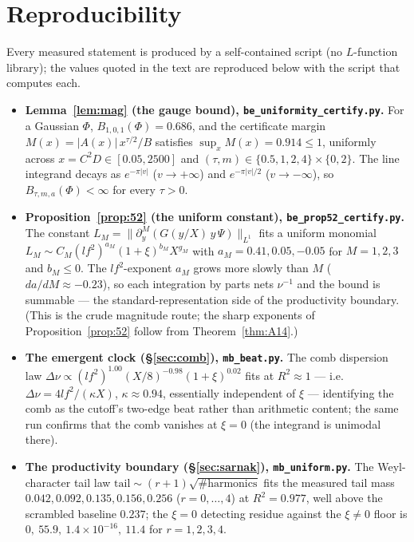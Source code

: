 \documentclass[11pt]{article}
\theoremstyle{definition}
\begin{document}
\appendix
\section{Reproducibility}\label{app:repro}

Every measured statement is produced by a self-contained script (no $L$-function library); the values
quoted in the text are reproduced below with the script that computes each.

\begin{itemize}
\item \textbf{Lemma~\ref{lem:mag} (the gauge bound), \texttt{be\_uniformity\_certify.py}.} For a
Gaussian $\Phi$, $B_{1,0,1}(\Phi)=0.686$, and the certificate margin
$M(x)=|A(x)|\,x^{\tau/2}/B$ satisfies $\sup_x M(x)=0.914\le1$, uniformly across $x=C^2D\in[0.05,2500]$
and $(\tau,m)\in\{0.5,1,2,4\}\times\{0,2\}$. The line integrand decays as $e^{-\pi|v|}$ ($v\to+\infty$)
and $e^{-\pi|v|/2}$ ($v\to-\infty$), so $B_{\tau,m,a}(\Phi)<\infty$ for every $\tau>0$.

\item \textbf{Proposition~\ref{prop:52} (the uniform constant), \texttt{be\_prop52\_certify.py}.} The
constant $L_M=\|\partial_y^M(G(y/X)\,y\,\Psi)\|_{L^1}$ fits a uniform monomial
$L_M\sim C_M(lf^2)^{a_M}(1+\xi)^{b_M}X^{g_M}$ with $a_M=0.41,0.05,-0.05$ for $M=1,2,3$ and $b_M\le0$.
The $lf^2$-exponent $a_M$ grows more slowly than $M$ ($da/dM\approx-0.23$), so each integration by
parts nets $\nu^{-1}$ and the bound is summable --- the standard-representation side of the
productivity boundary. (This is the crude magnitude route; the sharp exponents of
Proposition~\ref{prop:52} follow from Theorem~\ref{thm:A14}.)

\item \textbf{The emergent clock (\S\ref{sec:comb}), \texttt{mb\_beat.py}.} The comb dispersion law
$\Delta\nu\propto(lf^2)^{1.00}(X/8)^{-0.98}(1+\xi)^{0.02}$ fits at $R^2\approx1$ --- i.e.
$\Delta\nu=4lf^2/(\kappa X)$, $\kappa\approx0.94$, essentially independent of $\xi$ --- identifying the
comb as the cutoff's two-edge beat rather than arithmetic content; the same run confirms that the comb
vanishes at $\xi=0$ (the integrand is unimodal there).

\item \textbf{The productivity boundary (\S\ref{sec:sarnak}), \texttt{mb\_uniform.py}.} The
Weyl-character tail law $\text{tail}\sim(r{+}1)\sqrt{\#\text{harmonics}}$ fits the measured tail mass
$0.042,0.092,0.135,0.156,0.256$ ($r=0,\dots,4$) at $R^2=0.977$, well above the scrambled baseline
$0.237$; the $\xi=0$ detecting residue against the $\xi\neq0$ floor is
$0,\ 55.9,\ 1.4\times10^{-16},\ 11.4$ for $r=1,2,3,4$.


\end{itemize}
\end{document}
